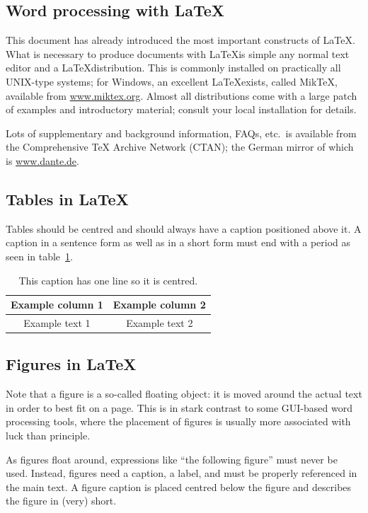 \documentclass[12pt,twoside]{article}
\theoremstyle{plain}
\theoremstyle{definition}
\theoremstyle{remark}
\begin{document}
\subsection{Word processing with \LaTeX}
\label{sec:model:subsec:latex}

This document has already introduced the most important constructs of
\LaTeX. What is necessary to produce documents with \LaTeX is simple
any normal text editor and a \LaTeX distribution. This is commonly
installed on practically all UNIX-type systems; for Windows, an
excellent \LaTeX exists, called MikTeX, available from
\url{www.miktex.org}. Almost all distributions come with a large patch
of examples and introductory material; consult your local installation
for details. 

Lots of supplementary and background information, FAQs, etc.\ is
available from the Comprehensive TeX Archive Network (CTAN); the
German mirror of which is \url{www.dante.de}. 

\subsection{Tables in \LaTeX}
\label{sec:model:subsec:tables}
Tables should be centred and should always have a caption 
positioned above it. A caption in a sentence form as well as in a short form must end with a period as seen in table~\ref{tab:sample}.

\begin{table}[hbtp]
  \caption{This caption has one line so it is centred.}\label{tab:sample} 
  \centering
  \begin{tabular}{|c|c|}
    \hline
    Example column 1 & Example column 2 \\
    \hline
    Example text 1 & Example text 2 \\
    \hline
  \end{tabular}
\end{table}


\subsection{Figures in \LaTeX}
\label{sec:model:subsec:figures}
Note that a figure is a so-called floating object: it is moved around the actual
text in order to best fit on a page. This is in stark contrast to some
GUI-based word processing tools, where the placement of figures is
usually more associated with luck than principle.

As figures float around, expressions like ``the following figure''
must never be used. Instead, figures need a caption, a label, and must
be properly referenced in the main text. A figure caption is placed centred below the figure and describes the figure in (very) short. 
\end{document}
